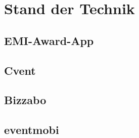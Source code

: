 \chapter{Stand der Technik}
\section{EMI-Award-App}
\section{Cvent}
\section{Bizzabo}
\section{eventmobi}